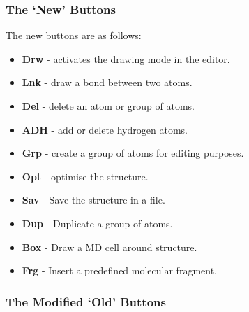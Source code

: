 \subsubsection{The `New' Buttons}

The new buttons are as follows:

\begin{itemize}
\item {\bf Drw} - activates the drawing mode in the editor.
\item {\bf Lnk} - draw a bond between two atoms.
\item {\bf Del} - delete an atom or group of atoms.
\item {\bf ADH} - add or delete hydrogen atoms.
\item {\bf Grp} - create a group of atoms for editing purposes.
\item {\bf Opt} - optimise the structure.
\item {\bf Sav} - Save the structure in a file.
\item {\bf Dup} - Duplicate a group of atoms.
\item {\bf Box} - Draw a MD cell around structure.
\item {\bf Frg} - Insert a predefined molecular fragment.
\end{itemize}

\subsubsection{The Modified `Old' Buttons}

